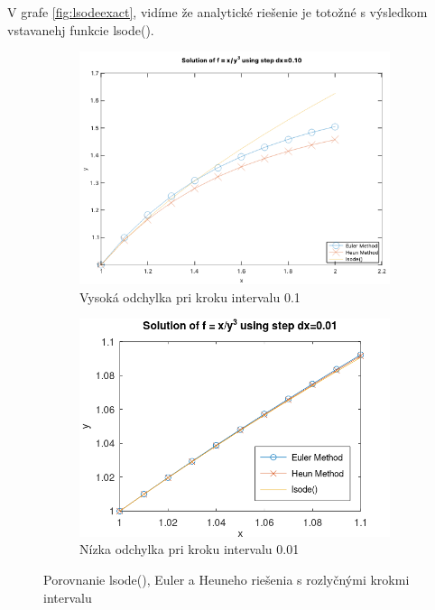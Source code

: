\documentclass{article}
\theoremstyle{definition}
\theoremstyle{remark}
\begin{document}
V grafe \ref{fig:lsodeexact}, vidíme že analytické riešenie je totožné s výsledkom vstavanehj funkcie lsode().
\begin{figure}[H]
  \centering
  \begin{subfigure}[b]{0.49\textwidth}
    \includegraphics[width=\textwidth]{hw1_gpr4.png}
    \caption{Vysoká odchylka pri kroku intervalu 0.1}
  \end{subfigure}
  \hfill
  \begin{subfigure}[b]{0.49\textwidth}
    \includegraphics[width=\textwidth]{lsode.png}
    \caption{Nízka odchylka pri kroku intervalu 0.01}
  \end{subfigure}
 
  \caption{Porovnanie lsode(), Euler a Heuneho riešenia s rozlyčnými krokmi intervalu}
\end{figure}
\end{document}
